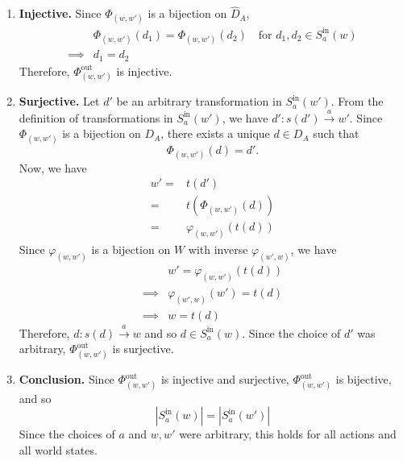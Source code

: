 \begin{proofE}
\begin{enumerate}
\begin{enumerate}
        \item \textbf{Injective.}
        Since $\Phi_{(w, w')}$ is a bijection on $\hat{D}_{A}$,
        \begin{align}
            & \Phi_{(w, w')}(d_{1}) = \Phi_{(w, w')}(d_{2}) \quad \text{for $d_{1}, d_{2} \in S_{a}^{\text{in}}(w)$} \\
            \implies & d_{1} = d_{2}
        \end{align}
        Therefore, $\Phi_{(w, w')}^{\text{out}}$ is injective.

        \item \textbf{Surjective.}
        Let $d'$ be an arbitrary transformation in $S_{a}^{\text{in}}(w')$.
        From the definition of transformations in $S_{a}^{\text{in}}(w')$, we have $d': s(d') \xrightarrow{a} w'$.
        Since $\Phi_{(w, w')}$ is a bijection on $D_{A}$, there exists a unique $d \in D_{A}$ such that
        \begin{equation}
            \Phi_{(w, w')}(d) = d'.
        \end{equation}
        Now, we have
        \begin{align}
            w' = & t(d') \\
            = & t(\Phi_{(w, w')}(d)) \\
            = & \varphi_{(w, w')}(t(d))
        \end{align}
        Since $\varphi_{(w, w')}$ is a bijection on $W$ with inverse $\varphi_{(w', w)}$, we have
        \begin{align}
            & w' = \varphi_{(w, w')}(t(d)) \\
            \implies & \varphi_{(w', w)}(w') = t(d) \\
            \implies & w = t(d)
        \end{align}
        Therefore, $d: s(d) \xrightarrow{a} w$ and so $d \in S_{a}^{\text{in}}(w)$.
        Since the choice of $d'$ was arbitrary, $\Phi_{(w, w')}^{\text{out}}$ is surjective.

        \item \textbf{Conclusion.}
        Since $\Phi_{(w, w')}^{\text{out}}$ is injective and surjective, $\Phi_{(w, w')}^{\text{out}}$ is bijective, and so
        \begin{equation}
            |S_{a}^{\text{in}}(w)| = |S_{a}^{\text{in}}(w')|
        \end{equation}
        Since the choices of $a$ and $w, w'$ were arbitrary, this holds for all actions and all world states.
    \end{enumerate}
\end{enumerate}
\end{proofE}

